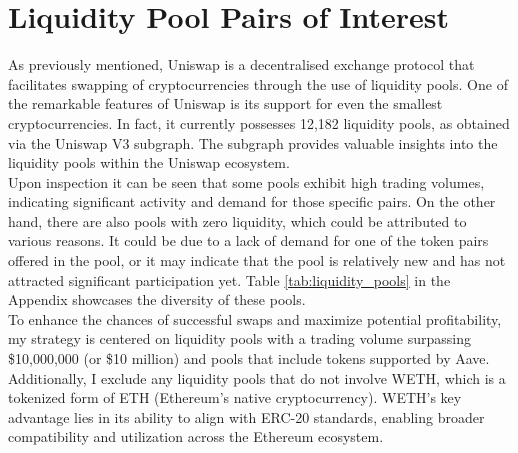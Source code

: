 \section{Liquidity Pool Pairs of Interest}
\label{sec:liquidity-pools}
As previously mentioned, Uniswap is a decentralised exchange protocol that facilitates swapping of cryptocurrencies through the use of liquidity pools. One of the remarkable features of Uniswap is its support for even the smallest cryptocurrencies. In fact, it currently possesses 12,182 liquidity pools, as obtained via the Uniswap V3 subgraph. The subgraph provides valuable insights into the liquidity pools within the Uniswap ecosystem.
\\[3mm]
Upon inspection it can be seen that some pools exhibit high trading volumes, indicating significant activity and demand for those specific pairs. On the other hand, there are also pools with zero liquidity, which could be attributed to various reasons. It could be due to a lack of demand for one of the token pairs offered in the pool, or it may indicate that the pool is relatively new and has not attracted significant participation yet. Table \ref{tab:liquidity_pools} in the Appendix showcases the diversity of these pools.
\\[3mm]
To enhance the chances of successful swaps and maximize potential profitability, my strategy is centered on liquidity pools with a trading volume surpassing \$10,000,000 (or \$10 million) and pools that include tokens supported by Aave. Additionally, I exclude any liquidity pools that do not involve WETH, which is a tokenized form of ETH (Ethereum's native cryptocurrency). WETH's key advantage lies in its ability to align with ERC-20 standards, enabling broader compatibility and utilization across the Ethereum ecosystem.

